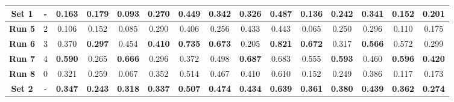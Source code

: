 \begin{table}[!ht]
{\begin{tabular}{|c|c|ccc|ccc|ccc|c|c|c|c|}
		\hline
	
		\textbf{Set 1} & - & \multicolumn{1}{c|}{0.163} & \multicolumn{1}{c|}{0.179} & 0.093 & \multicolumn{1}{c|}{0.270} & \multicolumn{1}{c|}{0.449} & 0.342 & \multicolumn{1}{c|}{0.326} & \multicolumn{1}{c|}{0.487} & 0.136 & 0.242 & 0.341 & 0.152 & 0.201 \\ 
	
		\hline
		\hline
	
		\textbf{Run 5} & 2 & \multicolumn{1}{c|}{0.106} & \multicolumn{1}{c|}{0.152} & 0.085 & \multicolumn{1}{c|}{0.290} & \multicolumn{1}{c|}{0.406} & 0.256 & \multicolumn{1}{c|}{0.433} & \multicolumn{1}{c|}{0.443} & 0.065 & 0.250 & 0.296 & 0.110 & 0.175 \\
		
		\textbf{Run 6} & 3 & \multicolumn{1}{c|}{0.370} & \multicolumn{1}{c|}{\textbf{0.297}} & 0.454 & \multicolumn{1}{c|}{\textbf{0.410}} & \multicolumn{1}{c|}{\textbf{0.735}} & \textbf{0.673} & \multicolumn{1}{c|}{0.205} & \multicolumn{1}{c|}{\textbf{0.821}} & \textbf{0.672} & 0.317 & \textbf{0.566} & 0.572 & 0.299 \\
		
		\textbf{Run 7} & 4 & \multicolumn{1}{c|}{\textbf{0.590}} & \multicolumn{1}{c|}{0.265} & \textbf{0.666} & \multicolumn{1}{c|}{0.296} & \multicolumn{1}{c|}{0.372} & 0.498 & \multicolumn{1}{c|}{\textbf{0.687}} & \multicolumn{1}{c|}{0.683} & 0.555 & \textbf{0.593} & 0.460 & \textbf{0.596} & \textbf{0.420} \\ 
		
		\textbf{Run 8} & 0 & \multicolumn{1}{c|}{0.321} & \multicolumn{1}{c|}{0.259} & 0.067 & \multicolumn{1}{c|}{0.352} & \multicolumn{1}{c|}{0.514} & 0.467 & \multicolumn{1}{c|}{0.410} & \multicolumn{1}{c|}{0.610} & 0.152 & 0.249 & 0.386 & 0.117 & 0.173 \\ 
		
		\hline
		
		\textbf{Set 2} & - & \multicolumn{1}{c|}{\textbf{0.347}} & \multicolumn{1}{c|}{\textbf{0.243}} & \textbf{0.318} & \multicolumn{1}{c|}{\textbf{0.337}} & \multicolumn{1}{c|}{\textbf{0.507}} & \textbf{0.474} & \multicolumn{1}{c|}{\textbf{0.434}} & \multicolumn{1}{c|}{\textbf{0.639}} & \textbf{0.361} & \textbf{0.380} & \textbf{0.439} & \textbf{0.362} & \textbf{0.274} \\ 
	
		\hline

	\end{tabular}}
	\label{tab:Experiment1.1Results}
\end{table}


